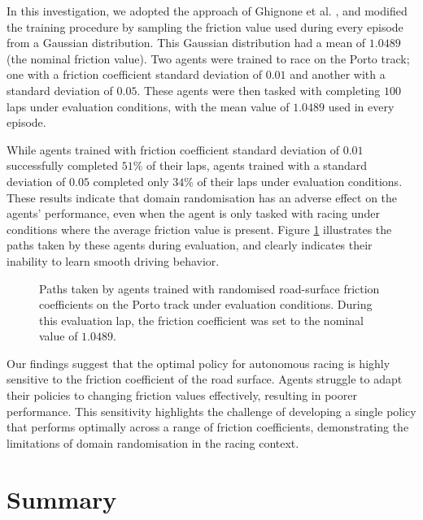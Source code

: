In this investigation, we adopted the approach of Ghignone et al. \cite{Ghignone2022}, and modified the training procedure by sampling the friction value used during every episode from a Gaussian distribution.
This Gaussian distribution had a mean of $1.0489$ (the nominal friction value).
Two agents were trained to race on the Porto track; one with a friction coefficient standard deviation of $0.01$ and another with a standard deviation of $0.05$.
These agents were then tasked with completing $100$ laps under evaluation conditions, with the mean value of $1.0489$ used in every episode.

While agents trained with friction coefficient standard deviation of $0.01$ successfully completed $51\%$ of their laps, agents trained with a standard deviation of $0.05$ completed only $34\%$ of their laps under evaluation conditions.
These results indicate that domain randomisation has an adverse effect on the agents' performance, even when the agent is only tasked with racing under conditions where the average friction value is present.
Figure \ref{fig:porto_domain_random} illustrates the paths taken by these agents during evaluation, and clearly indicates their inability to learn smooth driving behavior. 


\begin{figure}[htb!]
    \centering
    
    \caption[Paths taken by agents trained with randomised road-surface friction coefficients on the Porto track under evaluation conditions]{Paths taken by agents trained with randomised road-surface friction coefficients on the Porto track under evaluation conditions. During this evaluation lap, the friction coefficient was set to the nominal value of $1.0489$.}
    \label{fig:porto_domain_random}
\end{figure}


Our findings suggest that the optimal policy for autonomous racing is highly sensitive to the friction coefficient of the road surface. 
Agents struggle to adapt their policies to changing friction values effectively, resulting in poorer performance. 
This sensitivity highlights the challenge of developing a single policy that performs optimally across a range of friction coefficients, demonstrating the limitations of domain randomisation in the racing context.



\section{Summary}

